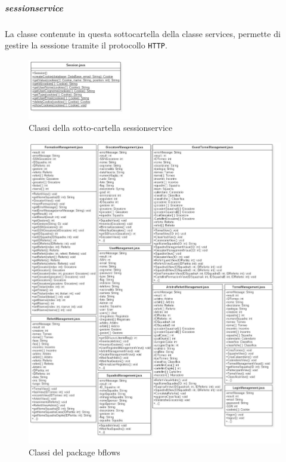 	
	\subparagraph{sessionservice}
	La classe contenute in questa sottocartella della classe services, permette di gestire la sessione tramite il protocollo \texttt{HTTP}.
	
	\begin{figure}[h]
		\centering
		\includegraphics[width=0.4\textwidth]
		{immagini/c-sessionservice}
		
		\caption{Classi della sotto-cartella sessionservice}
	\end{figure}
	
	
	\clearpage
	
	\begin{figure}[h]
		\centering
		\includegraphics[width=1\textwidth]
		{immagini/c-bflows}
		
		\caption{Classi del package bflows}
	\end{figure}
	
